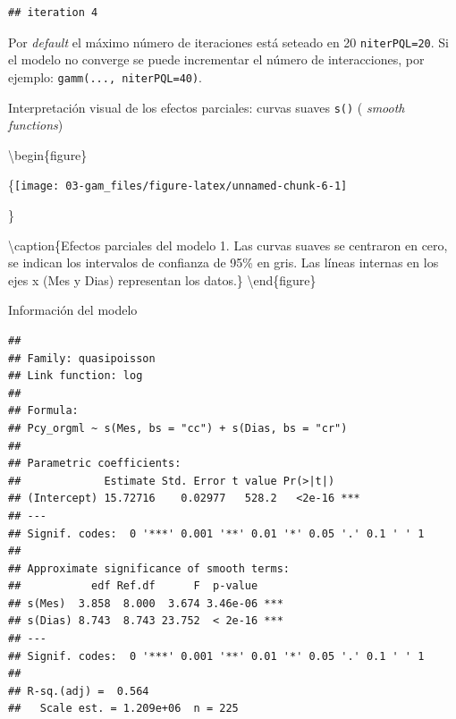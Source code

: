 \documentclass[
]{book}
\newenvironment{Shaded}{\begin{snugshade}}{\end{snugshade}}
\newcommand{\AttributeTok}[1]{\textcolor[rgb]{0.77,0.63,0.00}{#1}}
\newcommand{\DecValTok}[1]{\textcolor[rgb]{0.00,0.00,0.81}{#1}}
\newcommand{\FunctionTok}[1]{\textcolor[rgb]{0.00,0.00,0.00}{#1}}
\newcommand{\NormalTok}[1]{#1}
\newcommand{\SpecialCharTok}[1]{\textcolor[rgb]{0.00,0.00,0.00}{#1}}
\begin{document}
\begin{verbatim}
## iteration 4
\end{verbatim}

Por \emph{default} el máximo número de iteraciones está seteado en 20 \texttt{niterPQL=20}. Si el modelo no converge se puede incrementar el número de interacciones, por ejemplo: \texttt{gamm(...,\ niterPQL=40)}.

Interpretación visual de los efectos parciales: curvas suaves \texttt{s()} ( \emph{smooth functions})

\begin{Shaded}
\end{Shaded}

\textbackslash begin\{figure\}

\{\centering \texttt{[image: 03-gam\_files/figure-latex/unnamed-chunk-6-1]}

\}

\textbackslash caption\{Efectos parciales del modelo 1. Las curvas suaves se centraron en cero, se indican los intervalos de confianza de 95\% en gris. Las líneas internas en los ejes x (Mes y Dias) representan los datos.\}\label{fig:unnamed-chunk-6}
\textbackslash end\{figure\}

Información del modelo

\begin{Shaded}
\end{Shaded}

\begin{verbatim}
## 
## Family: quasipoisson 
## Link function: log 
## 
## Formula:
## Pcy_orgml ~ s(Mes, bs = "cc") + s(Dias, bs = "cr")
## 
## Parametric coefficients:
##             Estimate Std. Error t value Pr(>|t|)    
## (Intercept) 15.72716    0.02977   528.2   <2e-16 ***
## ---
## Signif. codes:  0 '***' 0.001 '**' 0.01 '*' 0.05 '.' 0.1 ' ' 1
## 
## Approximate significance of smooth terms:
##           edf Ref.df      F  p-value    
## s(Mes)  3.858  8.000  3.674 3.46e-06 ***
## s(Dias) 8.743  8.743 23.752  < 2e-16 ***
## ---
## Signif. codes:  0 '***' 0.001 '**' 0.01 '*' 0.05 '.' 0.1 ' ' 1
## 
## R-sq.(adj) =  0.564   
##   Scale est. = 1.209e+06  n = 225
\end{verbatim}
\end{document}
